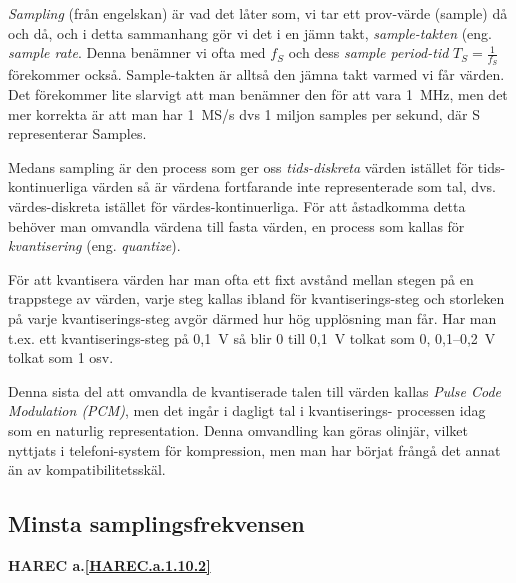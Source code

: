 \emph{Sampling} (från engelskan) är vad det låter som, vi tar ett prov-värde
(sample) då och då, och i detta sammanhang gör vi det i en jämn takt,
\emph{sample-takten} (eng. \emph{sample rate}. Denna benämner vi ofta med
\(f_S\) och dess \emph{sample period-tid} \(T_S=\frac{1}{f_S}\) förekommer
också. Sample-takten är alltså den jämna takt varmed vi får värden. Det
förekommer lite slarvigt att man benämner den för att vara 1~MHz, men det mer
korrekta är att man har 1~MS/s dvs 1 miljon samples per sekund, där S
representerar Samples.


Medans sampling är den process som ger oss \emph{tids-diskreta} värden istället
för tids-kontinuerliga värden så är värdena fortfarande inte representerade som
tal, dvs. värdes-diskreta istället för värdes-kontinuerliga. För att åstadkomma
detta behöver man omvandla värdena till fasta värden, en process som kallas för
\emph{kvantisering} (eng. \emph{quantize}).

För att kvantisera värden har man ofta ett fixt avstånd mellan stegen på en
trappstege av värden, varje steg kallas ibland för kvantiserings-steg och
storleken på varje kvantiserings-steg avgör därmed hur hög upplösning man får.
Har man t.ex. ett kvantiserings-steg på 0,1~V så blir 0 till 0,1~V tolkat som
0, 0,1--0,2~V tolkat som 1 osv.


Denna sista del att omvandla de kvantiserade talen till värden kallas
\emph{Pulse Code Modulation (PCM)}, men det ingår i dagligt tal i kvantiserings-
processen idag som en naturlig representation. Denna omvandling kan göras
olinjär, vilket nyttjats i telefoni-system för kompression, men man har börjat
frångå det annat än av kompatibilitetsskäl.

\subsection{Minsta samplingsfrekvensen}
\textbf{HAREC a.\ref{HAREC.a.1.10.2}\label{myHAREC.a.1.10.2}}


